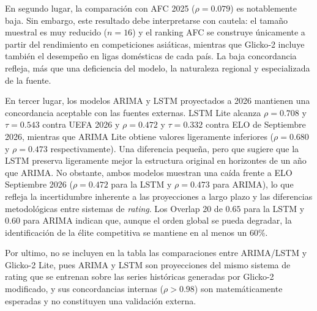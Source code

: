 En segundo lugar, la comparaci\'on con AFC 2025 (\(\rho = 0.079\)) es notablemente baja. Sin embargo, este resultado debe interpretarse con cautela: el tama\~no muestral es muy reducido (\(n = 16\)) y el ranking AFC se construye \'unicamente a partir del rendimiento en competiciones asi\'aticas, mientras que Glicko‑2 incluye tambi\'en el desempe\~no en ligas dom\'esticas de cada pa\'is. La baja concordancia refleja, m\'as que una deficiencia del modelo, la naturaleza regional y especializada de la fuente.

En tercer lugar, los modelos ARIMA y LSTM proyectados a 2026 mantienen una concordancia aceptable con las fuentes externas. LSTM Lite alcanza $\rho=0.708$ y $\tau=0.543$ contra UEFA 2026 y $\rho=0.472$ y $\tau=0.332$ contra ELO de Septiembre 2026, mientras que ARIMA Lite obtiene valores ligeramente inferiores ($\rho=0.680$ y $\rho=0.473$ respectivamente). Una diferencia peque\~na, pero que sugiere que la LSTM preserva ligeramente mejor la estructura original en horizontes de un a\~no que ARIMA. No obstante, ambos modelos muestran una ca\'ida frente a ELO Septiembre 2026 ($\rho=0.472$ para la LSTM y $\rho=0.473$ para ARIMA), lo que refleja la incertidumbre inherente a las proyecciones a largo plazo y las diferencias metodol\'ogicas entre sistemas de \textit{rating}. Los Overlap 20 de $0.65$ para la LSTM y $0.60$ para ARIMA indican que, aunque el orden global se pueda degradar, la identificaci\'on de la \'elite competitiva se mantiene en al menos un $60\%$.

Por ultimo, no se incluyen en la tabla las comparaciones entre ARIMA/LSTM y Glicko-2 Lite, pues ARIMA y LSTM son proyecciones del mismo sistema de rating que se entrenan sobre las series hist\'oricas generadas por Glicko-2 modificado, y sus concordancias internas (\(\rho > 0.98\)) son matem\'aticamente esperadas y no constituyen una validaci\'on externa.

